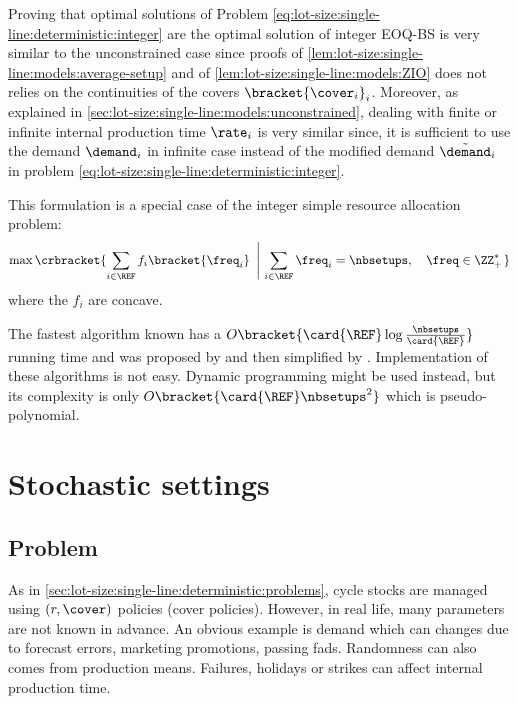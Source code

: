Proving that optimal solutions of Problem \eqref{eq:lot-size:single-line:deterministic:integer} are the optimal solution of integer EOQ-BS is very similar to the unconstrained case since proofs of \cref{lem:lot-size:single-line:models:average-setup} and of \cref{lem:lot-size:single-line:models:ZIO} does not relies on the continuities of the covers $\bracket{\cover_i}_i$.
Moreover, as explained in \cref{sec:lot-size:single-line:models:unconstrained}, dealing with finite or infinite internal production time $\rate_i$ is very similar since, it is sufficient to use the demand $\demand_i$ in infinite case instead of the modified demand $\tilde{\demand}_i$ in problem \eqref{eq:lot-size:single-line:deterministic:integer}.


\medskip


This formulation is a special case of the integer simple resource allocation problem:
\begin{equation}
  \max\crbracket{\sum_{i\in\REF} f_i\bracket{\freq_i}\ \left|\ \sum_{i\in\REF}\freq_i=\nbsetups,\quad\freq\in \ZZ_+^*\right.}
\end{equation}
where the $f_i$ are concave.


The fastest algorithm known has a $O\bracket{\card{\REF}\log{\frac{\nbsetups}{\card{\REF}}}}$ running time and was proposed by \cite{Frederickson1982} and then simplified by \cite{Hochbaum1994}.
Implementation of these algorithms is not easy.
Dynamic programming might be used instead, but its complexity is only $O\bracket{\card{\REF}\nbsetups^2}$ which is pseudo-polynomial.



\section{Stochastic settings}


\subsection{Problem}
\label{sec:lot-size:single-line:stochastic:problem}


As in \cref{sec:lot-size:single-line:deterministic:problems}, cycle stocks are managed using $(r,\cover)$ policies (\ie cover policies).
However, in real life, many parameters are not known in advance.
An obvious example is demand which can changes due to forecast errors, marketing promotions, passing fads.
Randomness can also comes from production means.
Failures, holidays or strikes can affect internal production time.


